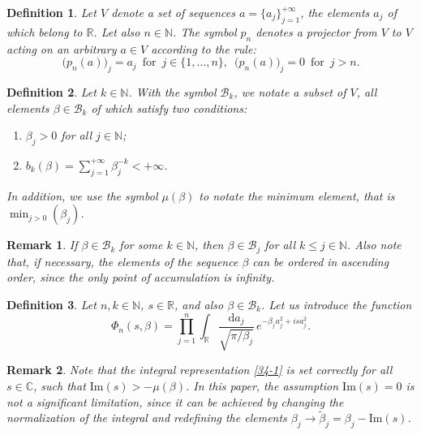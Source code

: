\documentclass[a4paper]{article}
\newtheorem{deff}{Definition}
\newtheorem{remark}{Remark}
\begin{document}
\begin{deff}\label{34-d-6}
Let $V$ denote a set of sequences $a=\{a_j\}_{j=1}^{+\infty}$, the elements $a_j$ of which belong to $\mathbb{R}$. Let also $n\in\mathbb{N}$. The symbol $p_n$ denotes a projector from $V$ to $V$ acting on an arbitrary $a\in V$ according to the rule:
\begin{equation}\label{34-21}
\big(p_n(a)\big)_j=a_j\,\,\,\mbox{for}\,\,\,j\in\{1,\ldots,n\},\,\,\,
\big(p_n(a)\big)_j=0\,\,\,\mbox{for}\,\,\,j>n.
\end{equation}
\end{deff}
\begin{deff}\label{34-d-7}
Let $k\in\mathbb{N}$. With the symbol $\mathcal{B}_k$, we notate a subset of $V$, all elements $\beta\in\mathcal{B}_k$ of which satisfy two conditions:
\begin{enumerate}
	\item $\beta_j>0$ for all $j\in\mathbb{N}$;
	\item $b_k(\beta)=\sum_{j=1}^{+\infty}\beta_j^{-k}<+\infty$.
\end{enumerate}
In addition, we use the symbol $\mu(\beta)$ to notate the minimum element, that is $\min_{j>0}(\beta_j)$.
\end{deff}
\begin{remark}\label{34-r-11}
If $\beta\in\mathcal{B}_k$ for some $k\in\mathbb{N}$, then $\beta\in\mathcal{B}_{j}$ for all $k\leqslant j\in\mathbb{N}$. Also note that, if necessary, the elements of the sequence $\beta$ can be ordered in ascending order, since the only point of accumulation is infinity.
\end{remark}
\begin{deff}\label{34-d-2}
Let $n,k\in\mathbb{N}$, $s\in\mathbb{R}$, and also $\beta\in\mathcal{B}_k$. Let us introduce the function
\begin{equation}\label{34-1}
\Phi_n(s,\beta)=
\prod_{j=1}^{n}\int_{\mathbb{R}}\frac{\mathrm{d}a_j}{\sqrt{\pi/\beta_j}}
\,e^{-\beta_j^{\phantom{1}}a_j^2+isa_j^2}.
\end{equation}
\end{deff}
\begin{remark}\label{34-r-1}
Note that the integral representation \eqref{34-1} is set correctly for all $s\in\mathbb{C}$, such that $\mathrm{Im}(s)>-\mu(\beta)$. In this paper, the assumption $\mathrm{Im}(s)=0$  is not a significant limitation, since it can be achieved by changing the normalization of the integral and redefining the elements $\beta_j\to\tilde{\beta}_j=\beta_j-\mathrm{Im}(s)$.
\end{remark}
\end{document}

